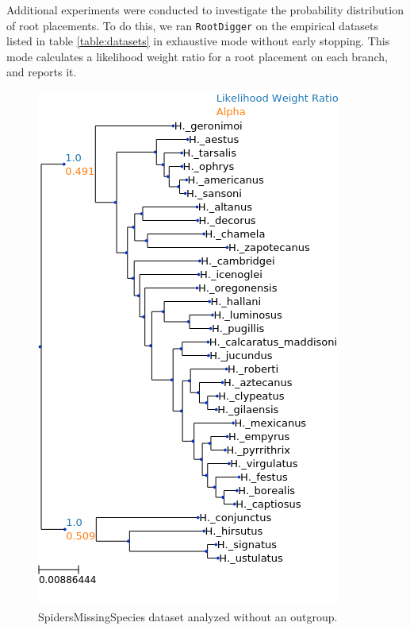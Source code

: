\documentclass{article}
\newcommand{\RootDiggertt}{\texttt{RootDigger}}
\begin{document}
Additional experiments were conducted to investigate the probability
distribution of root placements.
To do this, we ran \RootDiggertt{} on the empirical datasets listed in table
\ref{table:datasets} in exhaustive mode without early stopping.
This mode calculates a likelihood weight ratio for a root placement on each
branch, and reports it.

\begin{figure}
  \begin{center}
    \includegraphics[width=.75\linewidth]{
      figs/spiders/missing_species_no_outgroup_lwr.png}
    \caption{SpidersMissingSpecies dataset analyzed without an outgroup.}
    \label{fig:spiders-missing-species-no-outgroup}
  \end{center}
\end{figure}
\end{document}

